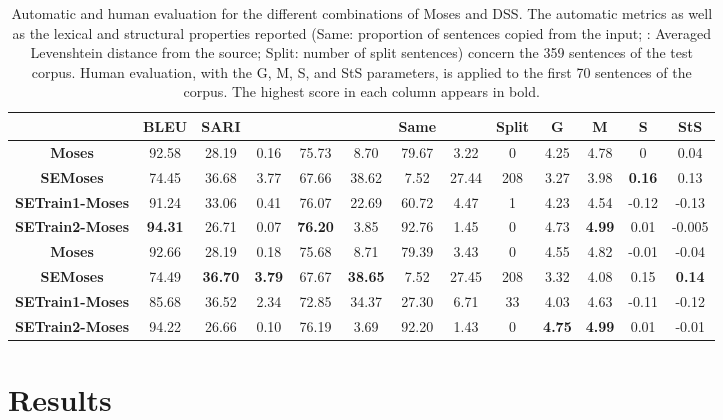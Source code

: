 \documentclass[11pt,a4paper]{article}
\begin{document}
\begin{center}
\begin{table*}[ht]
\scriptsize
\centering
\begin{tabular}{|c|c|c|c|c|c||c|c|c||c|c|c|c|}
\hline
& {\bf BLEU} & {\bf SARI} & {\bf } & {\bf } & {\bf } & {\bf  Same} &  & Split &{\bf G} & {\bf M} & {\bf S} & {\bf StS} \\
\hline
{\bf Moses} &92.58 &28.19 & 0.16 & 75.73 & 8.70 & 79.67 & 3.22& 0&4.25 & 4.78 & 0 & 0.04 \\
\hline      
{\bf SEMoses} &74.45  &36.68 & 3.77 & 67.66 & 38.62 & 7.52 & 27.44&208 &3.27 & 3.98 & {\bf 0.16} & 0.13 \\
\hline
{\bf SETrain1-Moses} &91.24 &33.06 & 0.41 & 76.07 & 22.69 &60.72 &4.47& 1& 4.23& 4.54& -0.12& -0.13 \\
\hline     
{\bf SETrain2-Moses} & {\bf 94.31} &26.71 & 0.07 &  {\bf 76.20}&3.85 &92.76&1.45& 0&4.73 & {\bf 4.99} & 0.01 & -0.005 \\
\hline
{\bf Moses} &92.66 &28.19 & 0.18 & 75.68 & 8.71 & 79.39 & 3.43& 0 & 4.55 &  4.82 & -0.01 & -0.04 \\
\hline
{\bf SEMoses} &74.49 &  {\bf 36.70} &  {\bf 3.79} & 67.67 &  {\bf 38.65}& 7.52 &27.45& 208 & 3.32 & 4.08  & 0.15 &  {\bf 0.14}\\
\hline
{\bf SETrain1-Moses} &85.68 &36.52 & 2.34 & 72.85 & 34.37 & 27.30 &6.71& 33& 4.03 & 4.63 & -0.11 & -0.12 \\
\hline
{\bf SETrain2-Moses} &94.22 &26.66 & 0.10 & 76.19 & 3.69& 92.20 &1.43& 0&  {\bf 4.75} & {\bf 4.99} & 0.01 & -0.01\\
\hline
\end{tabular}
\vspace{-0.1cm}
\hfill
\caption{Automatic and human evaluation for the different combinations of Moses and DSS. The automatic metrics as well as the lexical and structural properties reported (Same: proportion of sentences copied from the input; : Averaged Levenshtein distance from the source; Split: number of split sentences) concern the 359 sentences of the test corpus. Human evaluation, with the G, M, S, and StS parameters, is applied to the first 70 sentences of the corpus.
The highest score in each column appears in bold.
}

\label{moses-based}
\end{table*}
\end{center}

\vspace{-1.6cm}
\section{Results} \label{sec:results}
\end{document}
